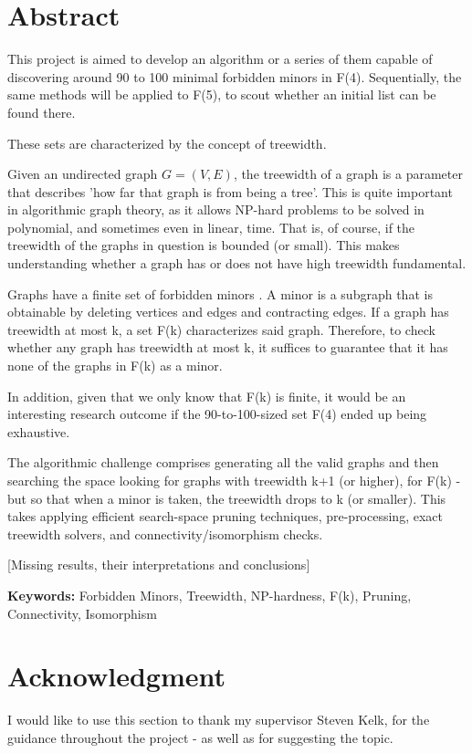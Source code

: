 \date{}

\section*{Abstract}

This project is aimed to develop an algorithm or a series of them capable of discovering around 90 to 100 minimal forbidden minors in F(4). Sequentially, the same methods will be applied to F(5), to scout whether an initial list can be found there.

These sets are characterized by the concept of treewidth.

Given an undirected graph $G=(V, E)$, the treewidth of a graph is a parameter that describes 'how far that graph is from being a tree'. This is quite important in algorithmic graph theory, as it allows NP-hard problems to be solved in polynomial, and sometimes even in linear, time. That is, of course, if the treewidth of the graphs in question is bounded (or small). This makes understanding whether a graph has or does not have high treewidth fundamental.

Graphs have a finite set of forbidden minors \cite{robertson2004wagners}. A minor is a subgraph that is obtainable by deleting vertices and edges and contracting edges. If a graph has treewidth at most k, a set F(k) characterizes said graph. Therefore, to check whether any graph has treewidth at most k, it suffices to guarantee that it has none of the graphs in F(k) as a minor. 

In addition, given that we only know that F(k) is finite, it would be an interesting research outcome if the 90-to-100-sized set F(4) ended up being exhaustive. 

The algorithmic challenge comprises generating all the valid graphs and then searching the space looking for graphs with treewidth k+1 (or higher), for F(k) - but so that when a minor is taken, the treewidth drops to k (or smaller). This takes applying efficient search-space pruning techniques, pre-processing, exact treewidth solvers, and connectivity/isomorphism checks.

[Missing results, their interpretations and conclusions]


\vspace{0.5cm}

\noindent
\textbf{Keywords:}
Forbidden Minors, Treewidth, NP-hardness, F(k), Pruning, Connectivity, Isomorphism

\vspace{1.0cm}

\section*{Acknowledgment}
I would like to use this section to thank my supervisor Steven Kelk, for the guidance throughout the project - as well as for suggesting the topic.


\newpage
\renewcommand*\contentsname{Table of Contents}
\tableofcontents

\newpage
